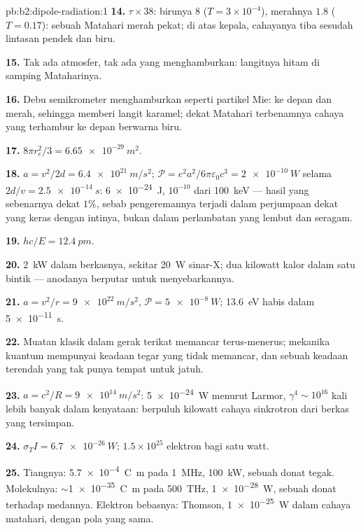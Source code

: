 \begin{solution}{pb:b2:dipole-radiation:1}
\textbf{14.} $\tau \times 38$: birunya $8$ ($T = 3 \times 10^{-4}$), merahnya $1.8$ ($T = 0.17$): sebuah
Matahari merah pekat; di atas kepala, cahayanya tiba sesudah lintasan pendek dan biru.

\textbf{15.} Tak ada atmosfer, tak ada yang menghamburkan: langitnya hitam di samping
Mataharinya.

\textbf{16.} Debu semikrometer menghamburkan seperti partikel Mie: ke depan dan
merah, sehingga memberi langit karamel; dekat Matahari terbenamnya cahaya yang
terhambur ke depan berwarna biru.

\textbf{17.} $8\pi r_e^2/3 = \qty{6.65e-29}{m^2}$.

\textbf{18.} $a = v^2/2d = \qty{6.4e21}{m/s^2}$; $\mathcal P = e^2a^2/6\pi\varepsilon_0c^3 =
\qty{2e-10}{W}$ selama $2d/v = \qty{2.5e-14}{s}$: \qty{6e-24}{J}, $10^{-10}$ dari
\qty{100}{keV} --- hasil yang sebenarnya dekat $1\%$, sebab pengeremannya terjadi
dalam perjumpaan dekat yang keras dengan intinya, bukan dalam perlambatan
yang lembut dan seragam.

\textbf{19.} $hc/E = \qty{12.4}{pm}$.

\textbf{20.} \qty{2}{kW} dalam berkasnya, sekitar \qty{20}{W} sinar-X; dua kilowatt
kalor dalam satu bintik --- anodanya berputar untuk menyebarkannya.

\textbf{21.} $a = v^2/r = \qty{9e22}{m/s^2}$, $\mathcal P = \qty{5e-8}{W}$; \qty{13.6}{eV} habis
dalam \qty{5e-11}{s}.

\textbf{22.} Muatan klasik dalam gerak terikat memancar terus-menerus;
mekanika kuantum mempunyai keadaan tegar yang tidak memancar, dan sebuah keadaan terendah
yang tak punya tempat untuk jatuh.

\textbf{23.} $a = c^2/R = \qty{9e14}{m/s^2}$: \qty{5e-24}{W} menurut Larmor, $\gamma^4 \sim 10^{16}$
kali lebih banyak dalam kenyataan: berpuluh kilowatt cahaya sinkrotron dari
berkas yang tersimpan.

\textbf{24.} $\sigma_TI = \qty{6.7e-26}{W}$; $1.5 \times 10^{25}$ elektron bagi satu watt.

\textbf{25.} Tiangnya: \qty{5.7e-4}{C.m} pada \qty{1}{MHz}, \qty{100}{kW}, sebuah donat
tegak. Molekulnya: $\sim$\qty{1e-35}{C.m} pada \qty{500}{THz}, \qty{1e-28}{W},
sebuah donat terhadap medannya. Elektron bebasnya: Thomson, \qty{1e-25}{W} dalam
cahaya matahari, dengan pola yang sama.
\end{solution}
